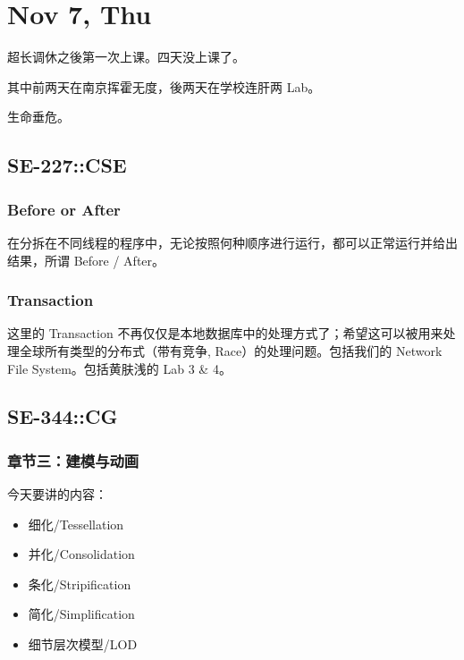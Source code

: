 \documentclass[
]{article}
\date{}
\begin{document}
\hypertarget{header-n0}{%
\section{Nov 7, Thu}\label{header-n0}}

超长调休之後第一次上课。四天没上课了。

其中前两天在南京挥霍无度，後两天在学校连肝两 Lab。

生命垂危。

\hypertarget{header-n5}{%
\subsection{SE-227::CSE}\label{header-n5}}

\hypertarget{header-n6}{%
\subsubsection{Before or After}\label{header-n6}}

在分拆在不同线程的程序中，无论按照何种顺序进行运行，都可以正常运行并给出结果，所谓
Before / After。

\hypertarget{header-n8}{%
\subsubsection{Transaction}\label{header-n8}}

这里的 Transaction
不再仅仅是本地数据库中的处理方式了；希望这可以被用来处理全球所有类型的分布式（带有竞争,
Race）的处理问题。包括我们的 Network File System。包括黄肤浅的 Lab 3 \&
4。

\hypertarget{header-n10}{%
\subsection{SE-344::CG}\label{header-n10}}

\hypertarget{header-n11}{%
\subsubsection{章节三：建模与动画}\label{header-n11}}

今天要讲的内容：

\begin{itemize}
\item
  细化/Tessellation
\item
  并化/Consolidation
\item
  条化/Stripification
\item
  简化/Simplification
\item
  细节层次模型/LOD
\end{itemize}
\end{document}
